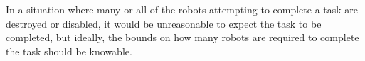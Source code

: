 
In a situation where many or all of the robots attempting to complete a task are destroyed or disabled, it would be unreasonable to expect the task to be completed, but ideally, the bounds on how many robots are required to complete the task should be knowable. 


